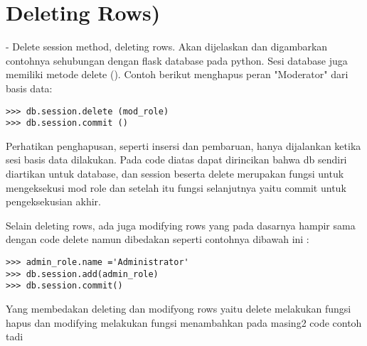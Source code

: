 \section{Deleting Rows)}
- Delete session method, deleting rows. Akan dijelaskan dan digambarkan contohnya sehubungan dengan flask database pada python.
Sesi database juga memiliki metode delete (). Contoh berikut menghapus peran "Moderator" dari basis data:
\begin{verbatim}
>>> db.session.delete (mod_role)
>>> db.session.commit ()
\end{verbatim}
Perhatikan penghapusan, seperti insersi dan pembaruan, hanya dijalankan ketika sesi basis data dilakukan.
Pada code diatas dapat dirincikan bahwa db sendiri diartikan untuk database, dan session beserta delete merupakan fungsi untuk mengeksekusi mod role
dan setelah itu fungsi selanjutnya yaitu commit untuk pengeksekusian akhir.

Selain deleting rows, ada juga modifying rows yang pada dasarnya hampir sama dengan code delete namun dibedakan seperti contohnya dibawah ini :
\begin{verbatim}
>>> admin_role.name ='Administrator'
>>> db.session.add(admin_role)
>>> db.session.commit()
\end{verbatim}

Yang membedakan deleting dan modifyong rows yaitu delete melakukan fungsi hapus dan modifying melakukan fungsi menambahkan pada masing2 code contoh tadi\cite{grinberg2018flask,}